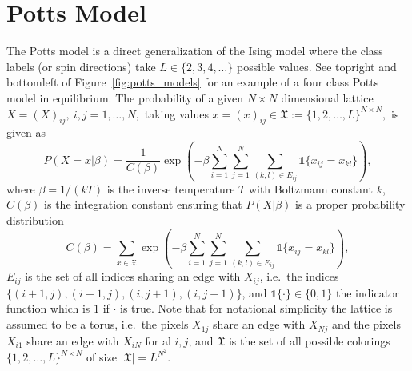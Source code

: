 \documentclass[12pt, twoside]{article}
\newcommand{\1}{\mathbb{1}}
\begin{document}
\section{Potts Model}\label{potts_model}
The Potts model is a direct generalization of the Ising model where the class labels (or spin directions) take $L \in \{2, 3, 4, \ldots\}$ possible values. 
See topright and bottomleft of Figure~\ref{fig:potts_models} for an example of a four class Potts model in equilibrium.
The probability of a given $N \times N$ dimensional lattice $X = (X)_{ij},\ i, j = 1, \ldots, N,$ taking values $x = (x)_{ij} \in \mathfrak X := \{1, 2, \ldots, L\}^{N \times N},$ is given as
\begin{equation}
P(X = x | \beta) = \frac{1}{C(\beta)} \exp \left(-\beta \sum_{i = 1}^N \sum_{j = 1}^N \sum_{(k,l) \in E_{ij}} \1 \{x_{ij} = x_{kl}\}\right),
\end{equation}
where $\beta = 1 / (k T)$ is the inverse temperature $T$ with Boltzmann constant $k$, $C(\beta)$ is the integration constant ensuring that $P(X|\beta)$ is a proper probability distribution
\begin{equation} \label{eq:cbeta}
C(\beta) = \sum_{x \in \mathfrak X} \exp \left(-\beta \sum_{i = 1}^N \sum_{j = 1}^N \sum_{(k,l) \in E_{ij}} \1 \{x_{ij} = x_{kl}\}\right), 
\end{equation}
$E_{ij}$ is the set of all indices sharing an edge with $X_{ij}$, i.e.\ the indices $\{(i + 1, j), (i - 1, j), (i, j + 1), (i, j - 1)\}$, and $\1\{\cdot\} \in\{0, 1\}$ the indicator function which is $1$ if $\cdot$ is true. Note that for notational simplicity the lattice is assumed to be a torus, i.e.\ the pixels $X_{1j}$ share an edge with $X_{Nj}$ and the pixels $X_{i1}$ share an edge with $X_{iN}$ for al $i, j$, and $\mathfrak X$ is the set of all possible colorings $\{1, 2, \ldots, L\}^{N \times N}$ of size $|\mathfrak X| = L^{N^2}$.
\end{document}
